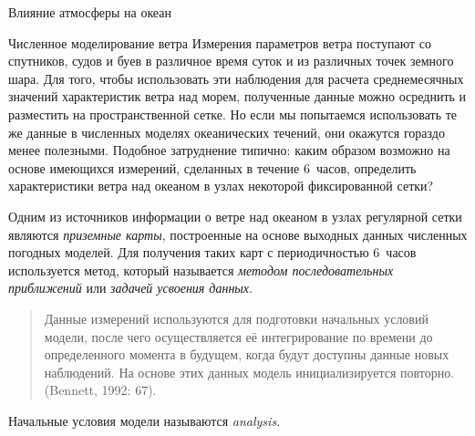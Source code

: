 \begin{chapter}{Влияние атмосферы на океан}
\begin{section}{Численное моделирование ветра}
Измерения параметров ветра поступают со спутников, судов и буев в различное 
время суток и из различных точек земного шара. Для того, чтобы использовать 
эти наблюдения для расчета среднемесячных значений характеристик ветра над 
морем, полученные данные можно осреднить и разместить на пространственной сетке. 
Но если мы попытаемся использовать те же данные в численных моделях 
океанических течений, они окажутся гораздо менее полезными. Подобное 
затруднение типично: каким образом возможно на основе имеющихся измерений,
сделанных в течение 6~часов, определить характеристики ветра над океаном
в узлах некоторой фиксированной сетки?
%

Одним из источников информации о ветре над океаном в узлах регулярной сетки
являются \emph{приземные карты}, построенные на основе выходных данных 
численных погодных моделей. Для получения таких карт с периодичностью 6~часов
используется метод, который называется 
\emph{методом последовательных приближений} 
или \emph{задачей усвоения данных}.
\begin{quotation} 
Данные измерений используются для подготовки начальных условий модели, 
после чего осуществляется её интегрирование по времени до определенного 
момента в будущем, когда будут доступны данные новых наблюдений. 
На основе этих данных модель инициализируется повторно. (Bennett, 1992: 67).
\end{quotation}
Начальные условия модели называются \textit{analysis}.
%


\end{section}
\end{chapter}
